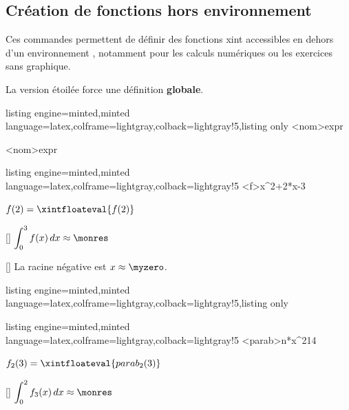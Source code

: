 \documentclass[11pt,a4paper]{ltxdoc}
\begin{document}
\subsection{Création de fonctions hors environnement}\label{genererfct}

Ces commandes permettent de définir des fonctions \textsf{xint} accessibles
en dehors d'un environnement , notamment pour
les calculs numériques ou les exercices sans graphique.

La version étoilée force une définition \textbf{globale}.

\begin{tcblisting}{listing engine=minted,minted language=latex,colframe=lightgray,colback=lightgray!5,listing only}
\GenererFonction<nom>{expr}

\GenererFonction*<nom>{expr}
\end{tcblisting}

\begin{tcblisting}{listing engine=minted,minted language=latex,colframe=lightgray,colback=lightgray!5}
\GenererFonction<f>{x^2+2*x-3}

$f(2) = \xintfloateval{f(2)}$

[\monres]
$\displaystyle\int_0^3 f(x)\,dx \approx \monres$

[\myzero]
La racine négative est $x \approx \myzero$.
\end{tcblisting}

\begin{tcblisting}{listing engine=minted,minted language=latex,colframe=lightgray,colback=lightgray!5,listing only}

\end{tcblisting}

\begin{tcblisting}{listing engine=minted,minted language=latex,colframe=lightgray,colback=lightgray!5}
\GenererFamilleFonctions<parab>{n*x^2}{1}{4}

$f_2(3) = \xintfloateval{parab_2(3)}$

[\monres]
$\displaystyle\int_0^2 f_3(x)\,dx \approx \monres$
\end{tcblisting}
\end{document}
